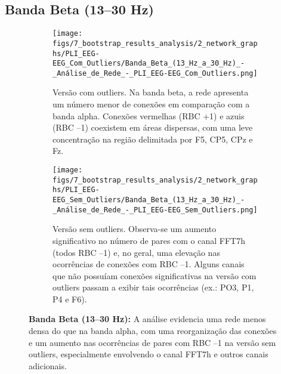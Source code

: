 \subsection{Banda Beta (13–30 Hz)}
\begin{figure}[H]
    \centering
    \begin{subfigure}[b]{0.48\textwidth}
        \texttt{[image: figs/7\_bootstrap\_results\_analysis/2\_network\_graphs/PLI\_EEG-EEG\_Com\_Outliers/Banda\_Beta\_(13\_Hz\_a\_30\_Hz)\_-\_Análise\_de\_Rede\_-\_PLI\_EEG-EEG\_Com\_Outliers.png]}
        \caption{\small Versão com outliers. Na banda beta, a rede apresenta um número menor de conexões em comparação com a banda alpha. Conexões vermelhas (RBC +1) e azuis (RBC –1) coexistem em áreas dispersas, com uma leve concentração na região delimitada por F5, CP5, CPz e Fz.}
    \end{subfigure}
    \hfill
    \begin{subfigure}[b]{0.48\textwidth}
        \texttt{[image: figs/7\_bootstrap\_results\_analysis/2\_network\_graphs/PLI\_EEG-EEG\_Sem\_Outliers/Banda\_Beta\_(13\_Hz\_a\_30\_Hz)\_-\_Análise\_de\_Rede\_-\_PLI\_EEG-EEG\_Sem\_Outliers.png]}
        \caption{\small Versão sem outliers. Observa-se um aumento significativo no número de pares com o canal FFT7h (todos RBC –1) e, no geral, uma elevação nas ocorrências de conexões com RBC –1. Alguns canais que não possuíam conexões significativas na versão com outliers passam a exibir tais ocorrências (ex.: PO3, P1, P4 e F6).}
    \end{subfigure}
    \caption[Análise de Rede – Banda Beta (PLI EEG–EEG)]{\small \textbf{Banda Beta (13–30 Hz):} A análise evidencia uma rede menos densa do que na banda alpha, com uma reorganização das conexões e um aumento nas ocorrências de pares com RBC –1 na versão sem outliers, especialmente envolvendo o canal FFT7h e outros canais adicionais.}
    \label{fig:rede_beta_pli}
\end{figure}

